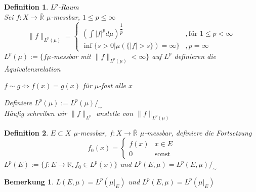 \documentclass[11pt]{memoir}
\theoremstyle{changebreak}
\newtheorem{Definition}{Definition}[chapter]
\newtheorem{Bemerkung}{Bemerkung}[chapter]
\begin{document}

\begin{Definition}
\emph{$L^p$-Raum} \\
Sei $f: X \rightarrow \overline{\mathbb R}$ $\mu$-messbar, $1 \leq p \leq \infty$ \\
\begin{equation}
\|f\|_{L^p (\mu)} =
\begin{cases}
	\left( \int |f|^p d\mu\right) ^{\dfrac{1}{p}} & , \text{für } 1 \leq p < \infty \\
	\inf \{s > 0 | \mu(\{|f| > s\}) = \infty \} & , p = \infty
\end{cases}
\end{equation}
$L^p(\mu):= \{f \mu$-messbar mit $\|f\|_{L^p (\mu)} < \infty\}$ auf $L^p$ definieren die Äquivalenzrelation
\begin{center}
	$f \sim g \Leftrightarrow f(x) = g(x)$ für $\mu$-fast alle $x$
\end{center}
Definiere $L^p(\mu) := L^p(\mu) /_\sim$ \\
Häufig schreiben wir $\|f\|_{L^p}$ anstelle von $\|f\|_{L^p (\mu)}$
\end{Definition}

\begin{Definition}
$E \subset X$ $\mu$-messbar, $f: X \rightarrow \overline{\mathbb R}$ $\mu$-messbar, definiere die Fortsetzung
\begin{equation}
f_0(x) =
\begin{cases}
	f(x) & x \in E \\
	0 & \text{sonst}
\end{cases}
\end{equation}
$L^p(E) := \{f: E \rightarrow \overline{\mathbb R}, f_0 \in L^p(x)\}$ und $L^p(E, \mu) = L^p(E, \mu)/_\sim$
\end{Definition}

\begin{Bemerkung}
$L(E, \mu) = L^p(\mu|_E)$ und $L^p(E, \mu) = L^p(\mu|_E)$
\end{Bemerkung}
\end{document}
